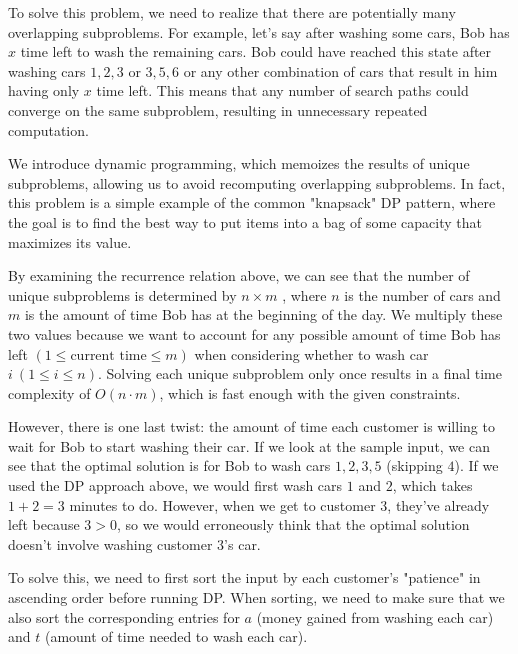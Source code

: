 To solve this problem, we need to realize that there are potentially many overlapping subproblems. For example, let's say after washing some cars, Bob has $x$ time left to wash the remaining cars. Bob could have reached this state after washing cars $1, 2, 3$ or $3, 5, 6$ or any other combination of cars that result in him having only $x$ time left. This means that any number of search paths could converge on the same subproblem, resulting in unnecessary repeated computation. 

We introduce dynamic programming, which memoizes the results of unique subproblems, allowing us to avoid recomputing overlapping subproblems. In fact, this problem is a simple example of the common "knapsack" DP pattern, where the goal is to find the best way to put items into a bag of some capacity that maximizes its value.

By examining the recurrence relation above, we can see that the number of unique subproblems is determined by $n \times m$ , where $n$ is the number of cars and $m$ is the amount of time Bob has at the beginning of the day. We multiply these two values because we want to account for any possible amount of time Bob has left $(1 \leq \text{current time} \leq m)$ when considering whether to wash car $i\ (1 \leq i \leq n)$. Solving each unique subproblem only once results in a final time complexity of $O(n \cdot m)$, which is fast enough with the given constraints.

However, there is one last twist: the amount of time each customer is willing to wait for Bob to start washing their car. If we look at the sample input, we can see that the optimal solution is for Bob to wash cars $1, 2, 3, 5$ (skipping $4$). If we used the DP approach above, we would first wash cars $1$ and $2$, which takes $1 + 2 = 3$ minutes to do. However, when we get to customer $3$, they've already left because $3 > 0$, so we would erroneously think that the optimal solution doesn't involve washing customer $3$'s car.

To solve this, we need to first sort the input by each customer's "patience" in ascending order before running DP. When sorting, we need to make sure that we also sort the corresponding entries for $a$ (money gained from washing each car) and $t$ (amount of time needed to wash each car).
